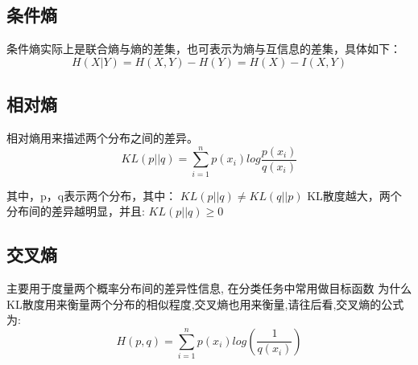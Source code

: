 \documentclass[UTF8]{ctexart}
\begin{document}
    \subsection{条件熵}
    条件熵实际上是联合熵与熵的差集，也可表示为熵与互信息的差集，具体如下：
    \begin{equation}
    H(X|Y) = H(X,Y) - H(Y) = H(X) - I(X, Y)
    \end{equation}

    \subsection{相对熵}
    相对熵用来描述两个分布之间的差异。
    \begin{equation}
    KL(p||q) = \sum^n_{i=1}p(x_i)log\frac{p(x_i)}{q(x_i)}
    \end{equation}
    
    其中，p，q表示两个分布，其中：
    $KL(p||q)≠KL(q||p)$
    KL散度越大，两个分布间的差异越明显，并且:
    $KL(p||q) ≥ 0$

    \subsection{交叉熵} 
    主要用于度量两个概率分布间的差异性信息, 在分类任务中常用做目标函数
    为什么KL散度用来衡量两个分布的相似程度,交叉熵也用来衡量,请往后看,交叉熵的公式为:
    \begin{equation}
    H(p, q) = \sum^n_{i=1}p(x_i)log(\frac{1}{q(x_i)})
    \end{equation}
\end{document}
